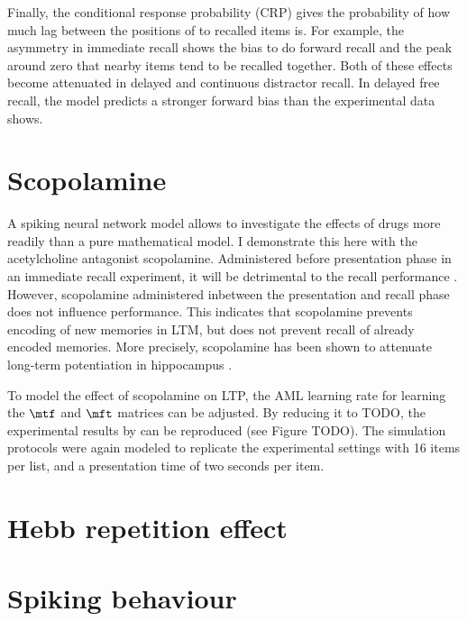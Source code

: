 Finally, the conditional response probability (CRP) gives the probability of how much lag between the positions of to recalled items is.
For example, the asymmetry in immediate recall shows the bias to do forward recall and the peak around zero that nearby items tend to be recalled together.
Both of these effects become attenuated in delayed and continuous distractor recall.
In delayed free recall, the model predicts a stronger forward bias than the experimental data shows.


\section{Scopolamine}
A spiking neural network model allows to investigate the effects of drugs more readily than a pure mathematical model.
I demonstrate this here with the acetylcholine antagonist scopolamine.
Administered before presentation phase in an immediate recall experiment, it will be detrimental to the recall performance \parencite{ghoneim1975}.
However, scopolamine administered inbetween the presentation and recall phase does not influence performance.
This indicates that scopolamine prevents encoding of new memories in LTM, but does not prevent recall of already encoded memories.
More precisely, scopolamine has been shown to attenuate long-term potentiation in hippocampus \parencite{leung2003,ito1988,hirotsu1989}.

To model the effect of scopolamine on LTP, the AML learning rate for learning the $\mtf$ and $\mft$ matrices can be adjusted.
By reducing it to TODO, the experimental results by \textcite{ghoneim1975} can be reproduced (see Figure TODO).
The simulation protocols were again modeled to replicate the experimental settings with 16 items per list, and a presentation time of two seconds per item.


\section{Hebb repetition effect}


\section{Spiking behaviour}
